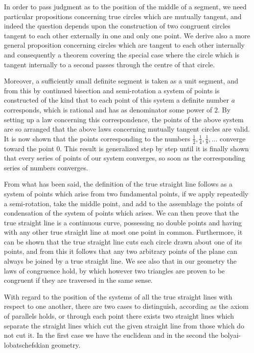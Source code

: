 \documentclass[11pt,oneside]{book}
\begin{document}
In order to pass judgment as to the position of the
middle of a segment, we need particular propositions
concerning true circles which are mutually tangent,
and indeed the question depends upon the construction
of two congruent circles tangent to each other externally
in one and only one point. We derive also
a more general proposition concerning circles which
are tangent to each other internally and consequently
a theorem covering the special case where the circle
which is tangent internally to a second passes through
the centre of that circle.

Moreover, a sufficiently small definite segment is
taken as a unit segment, and from this by continued
bisection and semi-rotation a system of points is constructed
of the kind that to each point of this system
a definite number $a$ corresponds, which is rational
and has as denominator some power of $2$. By setting
up a law concerning this correspondence, the points of
the above system are so arranged that the above laws
concerning mutually tangent circles are valid. It is
now shown that the points corresponding to the
numbers $\frac{1}{2}, \frac{1}{4}, \frac{1}{8}, \dots$ converge toward the point 0. This
result is generalized step by step until it is finally
shown that every series of points of our system converges,
so soon as the corresponding series of numbers
converges.

From what has been said, the definition of the true
straight line follows as a system of points which arise
from two fundamental points, if we apply repeatedly
a semi-rotation, take the middle point, and add to the
assemblage the points of condensation of the system of
points which arises. We can then prove that the true
straight line is a continuous curve, possessing no
double points and having with any other true straight
line at most one point in common. Furthermore, it
can be shown that the true straight line cuts each
circle drawn about one of its points, and from this it
follows that any two arbitrary points of the plane can
always be joined by a true straight line. We see also
that in our geometry the laws of congruence hold, by
which however two triangles are proven to be congruent
if they are traversed in the same sense.

With regard to the position of the systems of all
the true straight lines with respect to one another,
there are two cases to distinguish, according as the
axiom of parallels holds, or through each point there
exists two straight lines which separate the straight
lines which cut the given straight line from those
which do not cut it. In the first case we have the
euclidean and in the second the bolyai-lobatschefskian
geometry.
\end{document}
